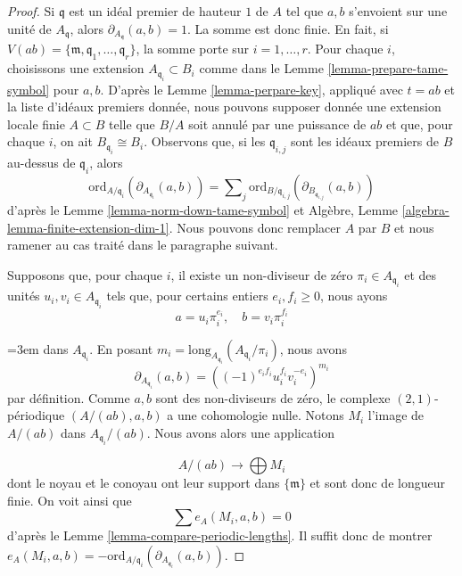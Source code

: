 \begin{proof}
Si $\mathfrak q$ est un idéal premier de hauteur $1$ de $A$ tel que $a, b$
s'envoient sur une unité de $A_\mathfrak q$, alors $\partial_{A_\mathfrak q}(a, b) = 1$.
La somme est donc finie. En fait, si
$V(ab) = \{\mathfrak m, \mathfrak q_1, \ldots, \mathfrak q_r\}$,
la somme porte sur $i = 1, \ldots, r$.
Pour chaque $i$, choisissons une extension $A_{\mathfrak q_i} \subset B_i$
comme dans le Lemme \ref{lemma-prepare-tame-symbol} pour $a, b$.
D'après le Lemme \ref{lemma-perpare-key}, appliqué avec $t = ab$ et la liste d'idéaux premiers donnée,
nous pouvons supposer donnée une extension locale finie $A \subset B$
telle que $B/A$ soit annulé par une puissance de $ab$ et que,
pour chaque $i$, on ait $B_{\mathfrak q_i} \cong B_i$.
Observons que, si les $\mathfrak q_{i, j}$ sont les idéaux premiers de $B$
au-dessus de $\mathfrak q_i$, alors
$$
\text{ord}_{A/\mathfrak q_i}(\partial_{A_{\mathfrak q_i}}(a, b))
=
\sum\nolimits_j
\text{ord}_{B/\mathfrak q_{i, j}}(\partial_{B_{\mathfrak q_{i, j}}}(a, b))
$$
d'après le Lemme \ref{lemma-norm-down-tame-symbol} et
Algèbre, Lemme \ref{algebra-lemma-finite-extension-dim-1}.
Nous pouvons donc remplacer $A$ par $B$ et
nous ramener au cas traité dans le paragraphe suivant.

\medskip\noindent
Supposons que, pour chaque $i$, il existe un non-diviseur de zéro
$\pi_i \in A_{\mathfrak q_i}$ et des unités $u_i, v_i \in A_{\mathfrak q_i}$
tels que, pour certains entiers $e_i, f_i \geq 0$, nous ayons
$$
a = u_i \pi_i^{e_i},\quad b = v_i \pi_i^{f_i}
$$
{\emergencystretch=3em dans $A_{\mathfrak q_i}$. En posant
$m_i = \text{long}_{A_{\mathfrak q_i}}(A_{\mathfrak q_i}/\pi_i)$,
nous avons
$$
\partial_{A_{\mathfrak q_i}}(a, b) =
((-1)^{e_if_i}u_i^{f_i}v_i^{-e_i})^{m_i}
$$
par définition.
Comme $a, b$ sont des non-diviseurs de zéro, le
complexe $(2, 1)$-périodique $(A/(ab), a, b)$ a une cohomologie nulle.
Notons $M_i$ l'image de $A/(ab)$ dans $A_{\mathfrak q_i}/(ab)$.
Nous avons alors une application\par}
$$
A/(ab) \longrightarrow \bigoplus M_i
$$
dont le noyau et le conoyau ont leur support dans $\{\mathfrak m\}$
et sont donc de longueur finie. On voit ainsi que
$$
\sum e_A(M_i, a, b) = 0
$$
d'après le Lemme \ref{lemma-compare-periodic-lengths}. Il suffit donc de montrer
$e_A(M_i, a, b) =
- \text{ord}_{A/\mathfrak q_i}(\partial_{A_{\mathfrak q_i}}(a, b))$.


\end{proof}
